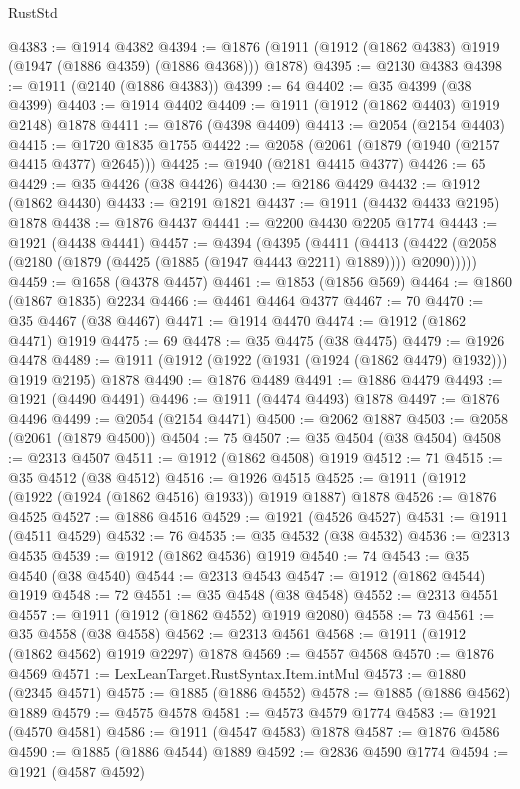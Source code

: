 \begin{lexlean}{RustStd}
\begin{coremodule}
@4383 := @1914 @4382
@4394 := @1876 (@1911 (@1912 (@1862 @4383) @1919 (@1947 (@1886 @4359) (@1886 @4368))) @1878)
@4395 := @2130 @4383
@4398 := @1911 (@2140 (@1886 @4383))
@4399 := 64
@4402 := @35 @4399 (@38 @4399)
@4403 := @1914 @4402
@4409 := @1911 (@1912 (@1862 @4403) @1919 @2148) @1878
@4411 := @1876 (@4398 @4409)
@4413 := @2054 (@2154 @4403)
@4415 := @1720 @1835 @1755
@4422 := @2058 (@2061 (@1879 (@1940 (@2157 @4415 @4377) @2645)))
@4425 := @1940 (@2181 @4415 @4377)
@4426 := 65
@4429 := @35 @4426 (@38 @4426)
@4430 := @2186 @4429
@4432 := @1912 (@1862 @4430)
@4433 := @2191 @1821
@4437 := @1911 (@4432 @4433 @2195) @1878
@4438 := @1876 @4437
@4441 := @2200 @4430 @2205 @1774
@4443 := @1921 (@4438 @4441)
@4457 := @4394
    (@4395
      (@4411
        (@4413 (@4422 (@2058 (@2180 (@1879 (@4425 (@1885 (@1947 @4443 @2211) @1889)))) @2090)))))
@4459 := @1658 (@4378 @4457)
@4461 := @1853 (@1856 @569)
@4464 := @1860 (@1867 @1835) @2234
@4466 := @4461 @4464 @4377
@4467 := 70
@4470 := @35 @4467 (@38 @4467)
@4471 := @1914 @4470
@4474 := @1912 (@1862 @4471) @1919
@4475 := 69
@4478 := @35 @4475 (@38 @4475)
@4479 := @1926 @4478
@4489 := @1911 (@1912 (@1922 (@1931 (@1924 (@1862 @4479) @1932))) @1919 @2195) @1878
@4490 := @1876 @4489
@4491 := @1886 @4479
@4493 := @1921 (@4490 @4491)
@4496 := @1911 (@4474 @4493) @1878
@4497 := @1876 @4496
@4499 := @2054 (@2154 @4471)
@4500 := @2062 @1887
@4503 := @2058 (@2061 (@1879 @4500))
@4504 := 75
@4507 := @35 @4504 (@38 @4504)
@4508 := @2313 @4507
@4511 := @1912 (@1862 @4508) @1919
@4512 := 71
@4515 := @35 @4512 (@38 @4512)
@4516 := @1926 @4515
@4525 := @1911 (@1912 (@1922 (@1924 (@1862 @4516) @1933)) @1919 @1887) @1878
@4526 := @1876 @4525
@4527 := @1886 @4516
@4529 := @1921 (@4526 @4527)
@4531 := @1911 (@4511 @4529)
@4532 := 76
@4535 := @35 @4532 (@38 @4532)
@4536 := @2313 @4535
@4539 := @1912 (@1862 @4536) @1919
@4540 := 74
@4543 := @35 @4540 (@38 @4540)
@4544 := @2313 @4543
@4547 := @1912 (@1862 @4544) @1919
@4548 := 72
@4551 := @35 @4548 (@38 @4548)
@4552 := @2313 @4551
@4557 := @1911 (@1912 (@1862 @4552) @1919 @2080)
@4558 := 73
@4561 := @35 @4558 (@38 @4558)
@4562 := @2313 @4561
@4568 := @1911 (@1912 (@1862 @4562) @1919 @2297) @1878
@4569 := @4557 @4568
@4570 := @1876 @4569
@4571 := LexLeanTarget.RustSyntax.Item.intMul
@4573 := @1880 (@2345 @4571)
@4575 := @1885 (@1886 @4552)
@4578 := @1885 (@1886 @4562) @1889
@4579 := @4575 @4578
@4581 := @4573 @4579 @1774
@4583 := @1921 (@4570 @4581)
@4586 := @1911 (@4547 @4583) @1878
@4587 := @1876 @4586
@4590 := @1885 (@1886 @4544) @1889
@4592 := @2836 @4590 @1774
@4594 := @1921 (@4587 @4592)

\end{coremodule}
\end{lexlean}
